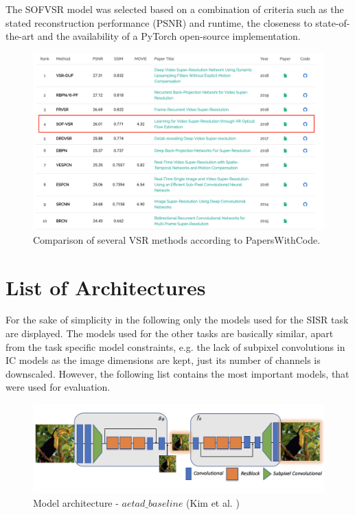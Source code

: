 The SOFVSR model was selected based on a combination of criteria such as the stated reconstruction performance (PSNR) and runtime, the closeness to
state-of-the-art and the availability of a PyTorch open-source implementation.

\begin{figure}[!ht]
	\centering
	\includegraphics[width=14cm]{figures/sofvsr_selection}
	\caption{Comparison of several \ac{VSR} methods according to PapersWithCode.}
  \label{fig:sofvsr_selection}
\end{figure}

\section*{List of Architectures}
For the sake of simplicity in the following only the models used for the \ac{SISR} task are displayed. The models used for the other tasks are basically similar, apart from the task specific model constraints, e.g. the lack of subpixel convolutions in \ac{IC} models as the image dimensions are kept, just its number of channels is downscaled. However, the following list contains the most important models, that were used for evaluation.   

\begin{figure}[!ht]
\centering
\includegraphics[width=14cm]{figures/architecture_baseline.png}
\caption{Model architecture - $aetad\_baseline$ (Kim et al. \cite{TAID})}
\end{figure}

